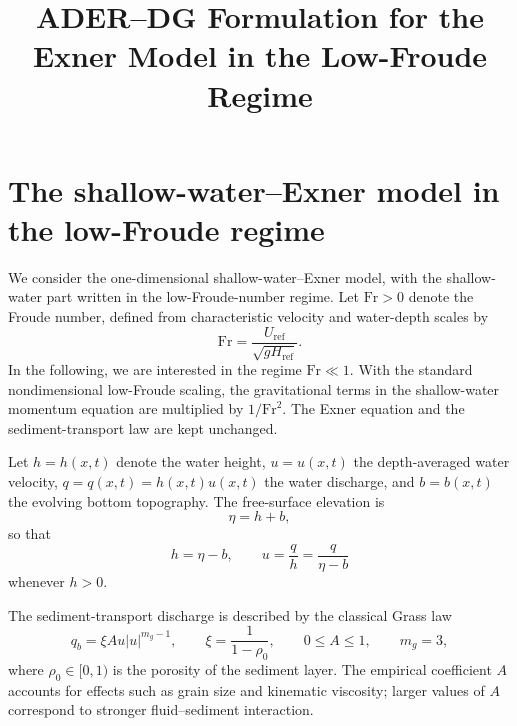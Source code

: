 \documentclass[11pt]{article}
\title{ADER--DG Formulation for the Exner Model in the Low-Froude Regime}
\author{}
\date{}
\begin{document}
\maketitle

\section{The shallow-water--Exner model in the low-Froude regime}

We consider the one-dimensional shallow-water--Exner model, with the
shallow-water part written in the low-Froude-number regime. Let
\(\mathrm{Fr}>0\) denote the Froude number, defined from characteristic velocity
and water-depth scales by
\[
    \mathrm{Fr}=\frac{U_{\mathrm{ref}}}{\sqrt{gH_{\mathrm{ref}}}}.
\]
In the following, we are interested in the regime \(\mathrm{Fr}\ll 1\). With the
standard nondimensional low-Froude scaling, the gravitational terms in the
shallow-water momentum equation are multiplied by \(1/\mathrm{Fr}^2\). The
Exner equation and the sediment-transport law are kept unchanged.

Let \(h=h(x,t)\) denote the water height, \(u=u(x,t)\) the depth-averaged water
velocity, \(q=q(x,t)=h(x,t)u(x,t)\) the water discharge, and \(b=b(x,t)\) the
evolving bottom topography. The free-surface elevation is
\[
    \eta=h+b,
\]
so that
\[
    h=\eta-b,
    \qquad
    u=\frac{q}{h}=\frac{q}{\eta-b}
\]
whenever \(h>0\).

The sediment-transport discharge is described by the classical Grass law
\[
    q_b=\xi A u\lvert u\rvert^{m_g-1},
    \qquad
    \xi=\frac{1}{1-\rho_0},
    \qquad
    0\leq A\leq 1,
    \qquad
    m_g=3,
\]
where \(\rho_0\in[0,1)\) is the porosity of the sediment layer. The empirical
coefficient \(A\) accounts for effects such as grain size and kinematic
viscosity; larger values of \(A\) correspond to stronger fluid--sediment
interaction.
\end{document}
